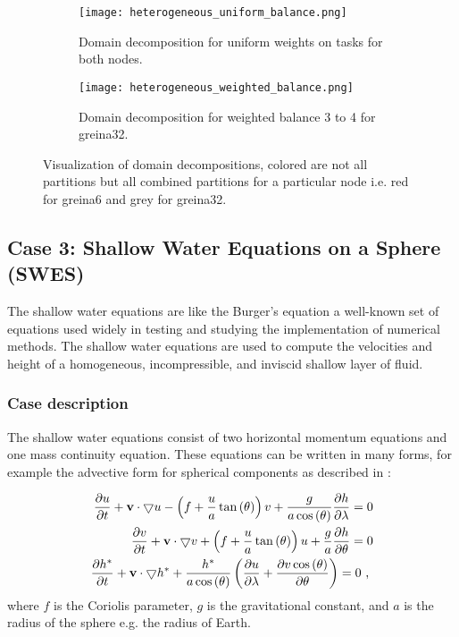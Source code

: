\begin{figure}[!htbp]
\centering
\begin{subfigure}[t]{\textwidth}
  \centering
  \texttt{[image: heterogeneous\_uniform\_balance.png]}
  \caption{Domain decomposition for uniform weights on tasks for both nodes.}
  \label{fig:uniform_balance}
\end{subfigure} \hfill
\begin{subfigure}[t]{\textwidth}
  \centering
  \texttt{[image: heterogeneous\_weighted\_balance.png]}
  \caption{Domain decomposition for weighted balance 3 to 4 for greina32.}
  \label{fig:weighted_balance}
\end{subfigure}
\label{fig:dynamic_distributions}
\caption{Visualization of domain decompositions, colored are not all partitions but all combined partitions for a particular node i.e. red for greina6 and grey for greina32.}
\end{figure}



\newpage
\subsection{Case 3: Shallow Water Equations on a Sphere (SWES)}
The shallow water equations are like the Burger's equation a well-known set of equations used widely in testing and studying the implementation of numerical methods.
The shallow water equations are used to compute the velocities and height of a homogeneous, incompressible, and inviscid shallow layer of fluid.

\subsubsection{Case description}
The shallow water equations consist of two horizontal momentum equations and one mass continuity equation.
These equations can be written in many forms, for example the advective form for spherical components as described in \citet{williamson1992standard}:

\begin{equation}
\label{eq:swes}
\begin{split}
\frac{\partial u}{\partial t} + \mathbf{v} \cdot \bigtriangledown u - \left( f + \frac{u}{a} \tan \left( \theta \right) \right) v + \frac{g}{a \cos \left( \theta \right)} \frac{\partial h}{\partial \lambda} = 0 \\
\frac{\partial v}{\partial t} + \mathbf{v} \cdot \bigtriangledown v + \left( f + \frac{u}{a} \tan \left( \theta \right) \right) u + \frac{g}{a} \frac{\partial h}{\partial \theta} = 0  \\
\frac{\partial h^*}{\partial t} + \mathbf{v} \cdot \bigtriangledown h^* + \frac{h^*}{a \cos \left( \theta \right)} \left( \frac{\partial u}{\partial \lambda} + \frac{\partial v \cos \left( \theta \right)}{\partial \theta} \right) = 0 \text{ , }
\end{split}
\end{equation}
where $f$ is the Coriolis parameter, $g$ is the gravitational constant, and $a$ is the radius of the sphere e.g. the radius of Earth.

